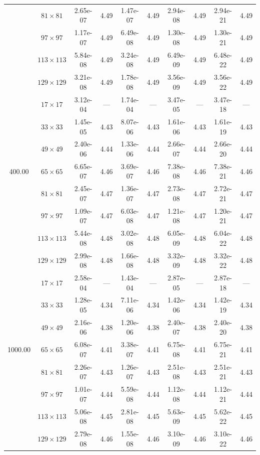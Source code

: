 \documentclass[preprint, 12pt]{elsarticle}
\begin{document}
\begin{center}
\begin{table}[H]
{\begin{tabular*}{\textwidth}{@{\extracolsep\fill}cccccccccc@{}}
    & $81\times 81$ & 2.65e-07 & 4.49 & 1.47e-07 & 4.49 & 2.94e-08 & 4.49 & 2.94e-21 & 4.49 \\
    & $97\times 97$ & 1.17e-07 & 4.49 & 6.49e-08 & 4.49 & 1.30e-08 & 4.49 & 1.30e-21 & 4.49 \\
    & $113\times 113$ & 5.84e-08 & 4.49 & 3.24e-08 & 4.49 & 6.49e-09 & 4.49 & 6.48e-22 & 4.49 \\
    & $129\times 129$ & 3.21e-08 & 4.49 & 1.78e-08 & 4.49 & 3.56e-09 & 4.49 & 3.56e-22 & 4.49 \\
    \hline\hline
    \multirow{7}{*}{400.00} & $17\times 17$ & 3.12e-04 & --- & 1.74e-04 & --- & 3.47e-05 & --- & 3.47e-18 & --- \\
    & $33\times 33$ & 1.45e-05 & 4.43 & 8.07e-06 & 4.43 & 1.61e-06 & 4.43 & 1.61e-19 & 4.43 \\
    & $49\times 49$ & 2.40e-06 & 4.44 & 1.33e-06 & 4.44 & 2.66e-07 & 4.44 & 2.66e-20 & 4.44 \\
    & $65\times 65$ & 6.65e-07 & 4.46 & 3.69e-07 & 4.46 & 7.38e-08 & 4.46 & 7.38e-21 & 4.46 \\
    & $81\times 81$ & 2.45e-07 & 4.47 & 1.36e-07 & 4.47 & 2.73e-08 & 4.47 & 2.72e-21 & 4.47 \\
    & $97\times 97$ & 1.09e-07 & 4.47 & 6.03e-08 & 4.47 & 1.21e-08 & 4.47 & 1.20e-21 & 4.47 \\
    & $113\times 113$ & 5.44e-08 & 4.48 & 3.02e-08 & 4.48 & 6.05e-09 & 4.48 & 6.04e-22 & 4.48 \\
    & $129\times 129$ & 2.99e-08 & 4.48 & 1.66e-08 & 4.48 & 3.32e-09 & 4.48 & 3.32e-22 & 4.48 \\
    \hline\hline
    \multirow{7}{*}{1000.00} & $17\times 17$ & 2.58e-04 & --- & 1.43e-04 & --- & 2.87e-05 & --- & 2.87e-18 & --- \\
    & $33\times 33$ & 1.28e-05 & 4.34 & 7.11e-06 & 4.34 & 1.42e-06 & 4.34 & 1.42e-19 & 4.34 \\
    & $49\times 49$ & 2.16e-06 & 4.38 & 1.20e-06 & 4.38 & 2.40e-07 & 4.38 & 2.40e-20 & 4.38 \\
    & $65\times 65$ & 6.08e-07 & 4.41 & 3.38e-07 & 4.41 & 6.75e-08 & 4.41 & 6.75e-21 & 4.41 \\
    & $81\times 81$ & 2.26e-07 & 4.43 & 1.26e-07 & 4.43 & 2.51e-08 & 4.43 & 2.51e-21 & 4.43 \\
    & $97\times 97$ & 1.01e-07 & 4.44 & 5.59e-08 & 4.44 & 1.12e-08 & 4.44 & 1.12e-21 & 4.44 \\
    & $113\times 113$ & 5.06e-08 & 4.45 & 2.81e-08 & 4.45 & 5.63e-09 & 4.45 & 5.62e-22 & 4.45 \\
    & $129\times 129$ & 2.79e-08 & 4.46 & 1.55e-08 & 4.46 & 3.10e-09 & 4.46 & 3.10e-22 & 4.46 \\
    \hline
    \end{tabular*}
}
\end{table}
\end{center}
\end{document}
